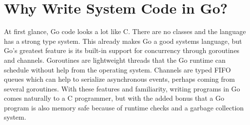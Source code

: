 
\chapter{Why Write System Code in Go?}

At first glance, Go code looks a lot like C. There are no
classes and the language has a strong type system.
This already makes Go a good systems language, but Go's
greatest feature is its built-in support for concurrency through
goroutines and channels. Goroutines are lightweight threads that
the Go runtime can schedule without help from the operating system.
Channels are typed FIFO queues which can help to serialize
asynchronous events, perhaps coming from several goroutines.
With these features and familiarity, writing programs in Go comes naturally to a C
programmer, but with the added bonus that a Go program is also
memory safe because of runtime checks and a garbage collection system.


